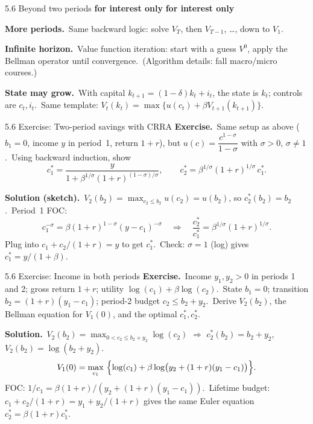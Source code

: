 \documentclass[11pt,aspectratio=169]{beamer}
\newcommand{\QFrame}[1]{\begin{frame}{#1 \quad {\small\textcolor{mAccent}{Together}}}}
\newcommand{\THFrame}[1]{\begin{frame}{#1 \quad {\small\textcolor{mAccent}{Take home}}}}
\newcommand{\InterestOnly}{\textcolor{mAccent}{\textbf{for interest only}}}
\begin{document}
\begin{frame}{5.6 Beyond two periods \InterestOnly}
  \footnotesize
  \InterestOnly

  \medskip
  \textbf{More periods.}\
  Same backward logic: solve $V_T$, then $V_{T-1}$, \ldots, down to $V_1$.

  \medskip
  \textbf{Infinite horizon.}\
  Value function iteration: start with a guess $V^0$, apply the Bellman operator until convergence.\
  (Algorithm details: fall macro/micro courses.)

  \medskip
  \textbf{State may grow.}\
  With capital $k_{t+1}=(1-\delta)k_t+i_t$, the state is $k_t$; controls are $c_t,i_t$.\
  Same template: $V_t(k_t)=\max\{u(c_t)+\beta V_{t+1}(k_{t+1})\}$.
\end{frame}

\QFrame{5.6 Exercise: Two-period savings with CRRA}
  \small
  \textbf{Exercise.}\
  Same setup as above ($b_1=0$, income $y$ in period~1, return $1+r$), but
  $u(c)=\dfrac{c^{1-\sigma}}{1-\sigma}$ with $\sigma>0$, $\sigma\neq 1$.\
  Using backward induction, show
  \[
    c_1^*=\frac{y}{1+\beta^{1/\sigma}(1+r)^{(1-\sigma)/\sigma}},
    \qquad
    c_2^*=\beta^{1/\sigma}(1+r)^{1/\sigma}\,c_1^*.
  \]

  \textbf{Solution (sketch).}\
  $V_2(b_2)=\max_{c_2\le b_2} u(c_2)=u(b_2)$, so $c_2^*(b_2)=b_2$.\
  Period~1 FOC:
  \[
    c_1^{-\sigma}=\beta(1+r)^{1-\sigma}(y-c_1)^{-\sigma}
    \quad\Longrightarrow\quad
    \frac{c_2^*}{c_1^*}=\beta^{1/\sigma}(1+r)^{1/\sigma}.
  \]
  Plug into $c_1+c_2/(1+r)=y$ to get $c_1^*$.\
  Check: $\sigma=1$ (log) gives $c_1^*=y/(1+\beta)$.
\end{frame}

\THFrame{5.6 Exercise: Income in both periods}
  \small
  \textbf{Exercise.}\
  Income $y_1,y_2>0$ in periods 1 and 2; gross return $1+r$; utility $\log(c_1)+\beta\log(c_2)$.\
  State $b_1=0$; transition $b_2=(1+r)(y_1-c_1)$; period-2 budget $c_2\le b_2+y_2$.\
  Derive $V_2(b_2)$, the Bellman equation for $V_1(0)$, and the optimal $c_1^*,c_2^*$.

  \textbf{Solution.}\
  $V_2(b_2)=\max_{0<c_2\le b_2+y_2}\log(c_2)$ $\Rightarrow$ $c_2^*(b_2)=b_2+y_2$, $V_2(b_2)=\log(b_2+y_2)$.\
  \[
    V_1(0)=\max_{c_1}\ \Bigl\{\log(c_1)+\beta\log\bigl(y_2+(1+r)(y_1-c_1)\bigr)\Bigr\}.
  \]
  FOC: $1/c_1=\beta(1+r)/(y_2+(1+r)(y_1-c_1))$.\
  Lifetime budget: $c_1+c_2/(1+r)=y_1+y_2/(1+r)$ gives the same Euler equation
  $c_2^*=\beta(1+r)c_1^*$.
\end{frame}
\end{document}
